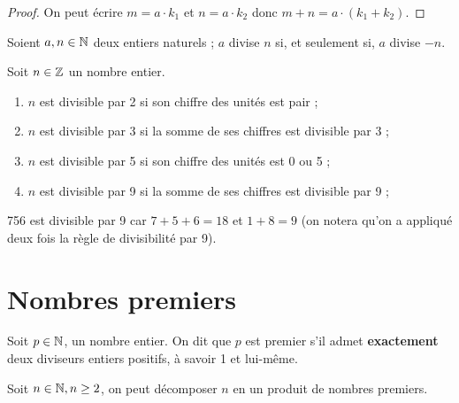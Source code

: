 \documentclass[a4paper, 12pt]{report}
\begin{document}
\begin{proof}
On peut écrire $m=a \cdot k_1$ et $n = a \cdot k_2$ donc $m+n = a \cdot (k_1 + k_2)$. 
\end{proof}

\begin{coro}
Soient $a, n \in \mathbb{N}$ deux entiers naturels ; $a$ divise $n$ si, et seulement si, $a$ divise $-n$.
\end{coro}

\begin{thm}
Soit $n \in \mathbb{Z}$ un nombre entier.

\begin{enumerate}[label=(\roman*)]
\item $n$ est divisible par 2 si son chiffre des unités est pair ;
\item $n$ est divisible par 3 si la somme de ses chiffres est divisible par 3 ;
\item $n$ est divisible par 5 si son chiffre des unités est 0 ou 5 ;
\item $n$ est divisible par 9 si la somme de ses chiffres est divisible par 9 ;
\end{enumerate}
\end{thm}

\begin{ex}
756 est divisible par 9 car $7+5+6=18$ et $1+8=9$ (on notera qu'on a appliqué deux fois la règle de divisibilité par 9).
\end{ex}

\section{Nombres premiers}

\begin{defn}
	Soit $p \in\mathbb{N}$, un nombre entier. On dit que $p$ est premier s'il admet \textbf{exactement} deux diviseurs entiers positifs,
	à savoir 1 et lui-même.
\end{defn}

\begin{thm}
Soit $n \in \mathbb{N}, n \geq 2$, on peut décomposer $n$ en un produit de nombres premiers. 
\end{thm}
\end{document}

